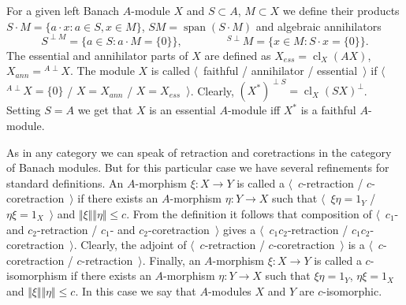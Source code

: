 For a given left Banach $A$-module $X$ and $S\subset A$, $M\subset X$ we define 
their products $S\cdot M= \{a\cdot x:a\in S, x\in M \}$, 
$SM=\operatorname{span} (S\cdot M)$ and algebraic annihilators 
$$
S^{\perp M}= \{a\in S:a\cdot M= \{0 \} \},
\qquad\qquad
{}^{S\perp}M= \{x\in M: S\cdot x= \{0 \} \}.
$$ 
The essential and annihilator
parts of $X$ are defined as $X_{ess}=\operatorname{cl}_X(A X)$,
$X_{ann}={}^{A\perp}X$. The module $X$ is called $\langle$~faithful /
annihilator / essential~$\rangle$ if $\langle$~${}^{A\perp}X= \{0 \}$ /
$X=X_{ann}$ / $X=X_{ess}$~$\rangle$. Clearly, 
${(X^*)}^{\perp S}={\operatorname{cl}_X(S X)}^\perp$. Setting $S=A$ we get that 
$X$ is an essential $A$-module iff $X^*$ is a faithful $A$-module.

As in any category we can speak of retraction and coretractions in the
category of Banach modules. But for this particular case we have several
refinements for standard definitions. An $A$-morphism $\xi:X\to Y$ is called
a $\langle$~$c$-retraction / $c$-coretraction~$\rangle$ if there exists an
$A$-morphism $\eta:Y\to X$ such that $\langle$~$\xi\eta=1_Y$ /
$\eta\xi=1_X$~$\rangle$ and $\Vert\xi\Vert\Vert\eta\Vert\leq c$. From the
definition it follows that composition of $\langle$~$c_1$- and $c_2$-retraction
/ $c_1$- and $c_2$-coretraction~$\rangle$ gives a $\langle$~$c_1c_2$-retraction
/ $c_1c_2$-coretraction~$\rangle$. Clearly, the adjoint of
$\langle$~$c$-retraction / $c$-coretraction~$\rangle$ is a
$\langle$~$c$-coretraction / $c$-retraction~$\rangle$. Finally, an $A$-morphism
$\xi:X\to Y$ is called a $c$-isomorphism if there exists an $A$-morphism
$\eta:Y\to X$ such that $\xi\eta=1_Y$, $\eta\xi=1_X$ and
$\Vert\xi\Vert\Vert\eta\Vert\leq c$. In this case we say that $A$-modules $X$
and $Y$ are $c$-isomorphic.

